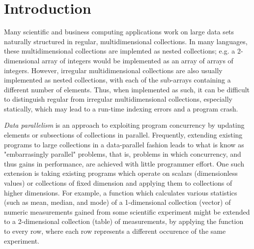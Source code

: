 
\chapter{Introduction}
Many scientific and business computing applications work on large data sets naturally structured in regular, multidimensional collections.
In many languages, these multidimensional collections are implemted as nested collections; e.g. a 2-dimensional array of integers would be implemented as an array of arrays of integers. %
However, irregular multidimensional collections are also usually implemented as nested collections, with each of the sub-arrays containing a different number of elements. %
Thus, when implemented as such, it can be difficult to distinguish regular from irregular multidimensional collections, especially statically, which may lead to a run-time indexing errors and a program crash. %

\textit{Data parallelism} is an approach to exploiting program concurrency by updating elements or subsections of collections in parallel. %
Frequently, extending existing programs to large collections in a data-parallel fashion leads to what is know as "embarrasingly parallel" problems, that is, problems in which concurrency, and thus gains in performance, are achieved with little programmer effort.%
One such extension is taking existing programs which operate on scalars (dimensionless values) or collections of fixed dimension and applying them to collections of higher dimensions.%
For example, a function which calculates various statistics (such as mean, median, and mode) of a 1-dimensional collection (vector) of numeric measurements gained from some scientific experiment might be extended to a 2-dimensional collection (table) of measurements, by applying the function to every row, where each row represents a different occurence of the same experiment.

